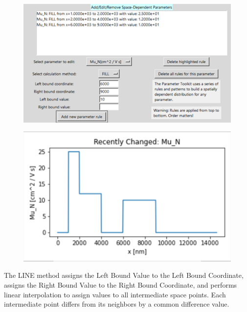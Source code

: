 \documentclass[11pt,letterpaper,titlepage]{article}
\begin{document}
		\begin{figure}[H]
			\label{fig:ptoolkit_fill}
			\centering
			\includegraphics[scale=1]{"ptoolkit_fill"}
		\end{figure}
		\begin{figure}[H]
			\label{fig:ptoolkit_fill_plot}
			\centering
			\includegraphics[scale=1]{"ptoolkit_fill_plot"}
		\end{figure}
		
		\par The LINE method assigns the Left Bound Value to the Left Bound Coordinate, assigns the Right Bound Value to the Right Bound Coordinate, and performs linear interpolation to assign values to all intermediate space points. Each intermediate point differs from its neighbors by a common difference value.
		
\end{document}

